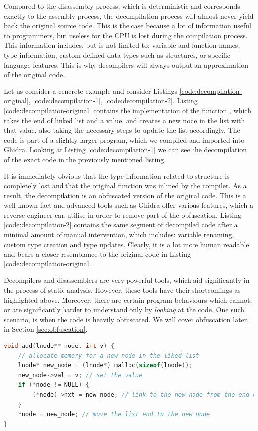 Compared to the disassembly process, which is deterministic and corresponds exactly to the assembly process, the decompilation process will almost never yield back the original source code. This is the case because a lot of information useful to programmers, but useless for the \gls{CPU} is lost during the compilation process. This information includes, but is not limited to: variable and function names, type information, custom defined data types such as structures, or specific language features. This is why decompilers will always output an approximation of the original code. 

Let us consider a concrete example and consider Listings \ref{code:decompilation-original}, \ref{code:decompilation-1}, \ref{code:decompilation-2}. Listing \ref{code:decompilation-original} contains the implementation of the function , which takes the end of linked list and a value, and creates a new node in the list with that value, also taking the necessary steps to update the list accordingly. The code is part of a slightly larger  program, which we compiled and imported into Ghidra. Looking at Listing \ref{code:decompilation-1} we can see the decompilation of the exact code in the previously mentioned listing. 

It is immediately obvious that the type information related to  structure is completely lost and that the original function was inlined by the compiler. As a result, the decompilation is an obfuscated version of the original code. This is a well known fact and advanced tools such as Ghidra offer various features, which a reverse engineer can utilise in order to remove part of the obfuscation. Listing \ref{code:decompilation-2} contains the same segment of decompiled code after a minimal amount of manual intervention, which includes: variable renaming, custom type creation and type updates. Clearly, it is a lot more human readable and bears a closer resemblance to the original code in Listing \ref{code:decompilation-original}. 

Decompilers and disassemblers are very powerful tools, which aid significantly in the process of static analysis. However, these tools have their shortcomings as highlighted above. Moreover, there are certain program behaviours which cannot, or are significantly harder to understand only by \emph{looking} at the code. One such scenario, is when the code is heavily obfuscated. We will cover obfuscation later, in Section \ref{sec:obfuscation}.

\begin{lstlisting}[language=c, label={code:decompilation-original}, caption={A function which adds an integer value \cc{v} to the end of a linked list.}]
void add(lnode** node, int v) {
    // allocate memory for a new node in the liked list
    lnode* new_node = (lnode*) malloc(sizeof(lnode));
    new_node->val = v; // set the value
    if (*node != NULL) {
        (*node)->nxt = new_node; // link to the new node from the end of the list
    }
    *node = new_node; // move the list end to the new node
}
\end{lstlisting}

